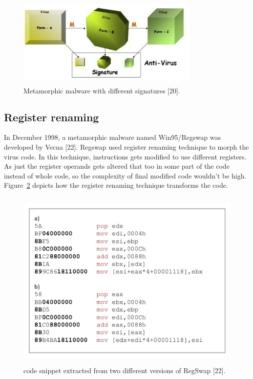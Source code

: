 \begin{figure}
  \centering
      \includegraphics[width=9cm, height=4.5cm]{aimalwarepic.png}
    \caption[Metamorphic malware with different signatures]{Metamorphic malware with different signatures [20].}
    \label{fig:aimalware}
\end{figure}

\subsection{Register renaming} 

In December 1998, a metamorphic malware named Win95/Regswap was developed by Vecna [22]. Regswap used register renaming technique to morph the virus code. In this technique, instructions gets modified to use different registers. As just the register operands gets altered that too in some part of the code instead of whole code, so the complexity of final modified code wouldn't be high. Figure~\ref{fig:regswap} depicts how the register renaming technique transforms the code.

\begin{figure}
  \centering
      \includegraphics[width=12.9cm, height=9cm]{regswap.jpg}
    \caption[Register Renaming Example]{code snippet extracted from two different versions of RegSwap [22].}
    \label{fig:regswap}
\end{figure}

